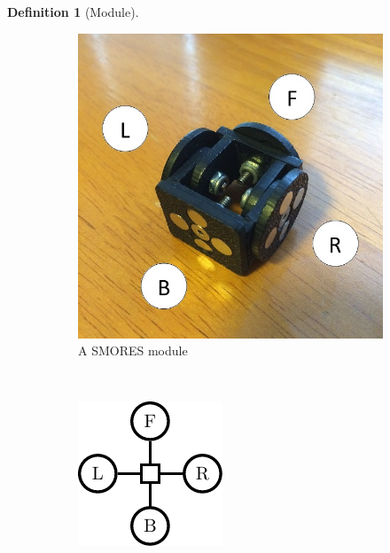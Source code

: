 \documentclass[conference]{IEEEtran}
\theoremstyle{definition}
\newtheorem{definition}{Definition}[section]
\begin{document}
\begin{definition}[Module]
\begin{figure}
\begin{center}
        \begin{subfigure}[b]{0.4\columnwidth}
                \includegraphics[width=\textwidth]{images/smores.JPG}
                \caption{A SMORES module}
                \label{fig:smores_photo}
           \end{subfigure}
           ~
        \begin{subfigure}[b]{0.4\columnwidth}
                \includegraphics[width=\textwidth]{images/tikz/smores.pdf}

\end{subfigure}
\end{center}
\end{figure}
\end{definition}
\end{document}
